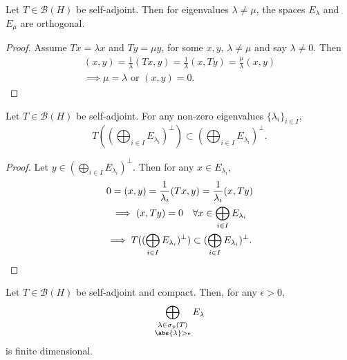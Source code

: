 \documentclass{article}
\begin{document}
\begin{lemma}
    Let $T \in \mathcal{B}(H)$ be self-adjoint.
    Then for eigenvalues $\lambda \neq \mu$, the spaces $E_\lambda$ and $E_\mu$ are orthogonal.
\end{lemma}

\begin{proof}
    Assume $T x = \lambda x$ and $T y = \mu y$, for some $x,y$, $\lambda \neq \mu$ and say $\lambda \neq 0$.
    Then
    \begin{gather*}
        (x,y) = \frac{1}{\lambda} (T x,y) = \frac{1}{\lambda} (x, T y) = \frac{\mu}{\lambda} (x,y) \\
        \implies \mu = \lambda \text{ or } (x, y) = 0.
    \end{gather*}
\end{proof}


\begin{lemma}
    Let $T \in \mathcal{B}(H)$ be self-adjoint. For any non-zero eigenvalues $\{\lambda_i\}_{i \in I}$,
    \begin{equation*}
        T((\bigoplus_{i \in I} E_{\lambda_i})^\perp) \subset (\bigoplus_{i \in I} E_{\lambda_i})^\perp.
    \end{equation*}
\end{lemma}

\begin{proof}
    Let $y \in (\bigoplus_{i \in I} E_{\lambda_i})^\perp$. Then for any $x \in E_{\lambda_i}$,
    \begin{gather*}
        0 = (x,y) = \frac{1}{\lambda_i} (T x, y) = \frac{1}{\lambda_i} (x, T y) \\
        \implies (x, T y) = 0 \quad \forall x \in \bigoplus_{i \in I} E_{\lambda_i} \\
        \implies T((\bigoplus_{i \in I} E_{\lambda_i})^\perp) \subset (\bigoplus_{i \in I} E_{\lambda_i})^\perp. \qedhere
    \end{gather*}
\end{proof}

\begin{lemma}
    Let $T \in \mathcal{B}(H)$ be self-adjoint and compact.
    Then, for any $\epsilon > 0$,
    \begin{equation*}
        \bigoplus_{\substack{\lambda \in \sigma_p(T) \\ \abs{\lambda} > \epsilon}} E_\lambda
    \end{equation*}
    is finite dimensional.
\end{lemma}
\end{document}
